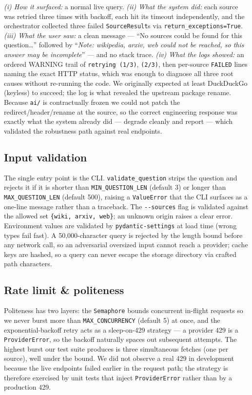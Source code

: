 \documentclass[11pt,a4paper]{article}
\begin{document}
\emph{(i) How it surfaced:} a normal live query. \emph{(ii) What the system did:} each source
was retried three times with backoff, each hit its timeout independently, and the orchestrator
collected three failed \texttt{SourceResult}s via \texttt{return\_exceptions=True}.
\emph{(iii) What the user saw:} a clean message --- ``No sources could be found for this
question\dots'' followed by ``\emph{Note: wikipedia, arxiv, web could not be reached, so this
answer may be incomplete}'' --- and no stack trace. \emph{(iv) What the logs showed:} an
ordered WARNING trail of \texttt{retrying (1/3)}, \texttt{(2/3)}, then per-source
\texttt{FAILED} lines naming the exact HTTP status, which was enough to diagnose all three
root causes without re-running the code. We originally expected at least DuckDuckGo (keyless)
to succeed; the log is what revealed the upstream package rename. Because \texttt{ai/} is
contractually frozen we could not patch the redirect/header/rename at the source, so the
correct engineering response was exactly what the system already did --- degrade cleanly and
report --- which validated the robustness path against real endpoints.

\subsection{Input validation}\label{sec:validation}

The single entry point is the CLI. \texttt{validate\_question} strips the question and rejects
it if it is shorter than \texttt{MIN\_QUESTION\_LEN} (default 3) or longer than
\texttt{MAX\_QUESTION\_LEN} (default 500), raising a \texttt{ValueError} that the CLI surfaces
as a one-line message rather than a traceback. The \texttt{-{}-sources} flag is validated
against the allowed set \texttt{\{wiki, arxiv, web\}}; an unknown origin raises a clear error.
Environment values are validated by \texttt{pydantic-settings} at load time (wrong types fail
fast). A 50{,}000-character query is rejected by the length bound before any network call, so
an adversarial oversized input cannot reach a provider; cache keys are hashed, so a query can
never escape the storage directory via crafted path characters.

\subsection{Rate limit \& politeness}

Politeness has two layers: the \texttt{Semaphore} bounds concurrent in-flight requests so we
never burst more than \texttt{MAX\_CONCURRENCY} (default 5) at once, and the exponential-backoff
retry acts as a sleep-on-429 strategy --- a provider 429 is a \texttt{ProviderError}, so the
backoff naturally spaces out subsequent attempts. The highest burst our test suite produces is
three simultaneous fetches (one per source), well under the bound. We did not observe a real
429 in development because the live endpoints failed earlier in the request path; the strategy
is therefore exercised by unit tests that inject \texttt{ProviderError} rather than by a
production 429.
\end{document}
